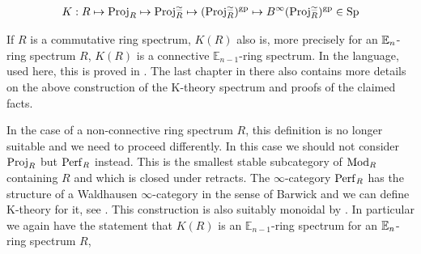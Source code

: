 \begin{align*}
        K: R\mapsto \operatorname{Proj}_R\mapsto \operatorname{Proj}_R^{\simeq}\mapsto (\operatorname{Proj}_R^{\simeq})^{\operatorname{gp}}\mapsto B^{\infty}(\operatorname{Proj}_R^{\simeq})^{\operatorname{gp}}\in \operatorname{Sp}
\end{align*}
\begin{rmk}
    If $R$ is a commutative ring spectrum, $K(R)$ also is, more precisely for an $\mathbb{E}_n$-ring spectrum $R$, $K(R)$ is a connective $\mathbb{E}_{n-1}$-ring spectrum. In the language, used here, this is proved in \cite{GGNuniversalityloop}. The last chapter in there also contains more details on the above construction of the K-theory spectrum and proofs of the claimed facts.
\end{rmk}
\begin{rmk}
    In the case of a non-connective ring spectrum $R$, this definition is no longer suitable and we need to proceed differently. In this case we should not consider $\operatorname{Proj}_R$ but $\operatorname{Perf}_R$ instead. This is the smallest stable subcategory of $\operatorname{Mod}_R$ containing $R$ and which is closed under retracts. The $\infty$-category $\operatorname{Perf}_R$ has the structure of a Waldhausen $\infty$-category in the sense of Barwick and we can define K-theory for it, see \cite[Chapter~11]{barwickK-theory}. This construction is also suitably monoidal by \cite[Proposition~3.8]{barwick2013multiplicative}. In particular we again have the statement that $K(R)$ is an $\mathbb{E}_{n-1}$-ring spectrum for an $\mathbb{E}_n$-ring spectrum $R$, 
\end{rmk}
